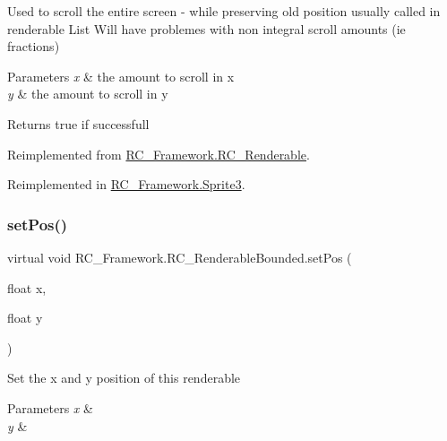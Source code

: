 Used to scroll the entire screen -\/ while preserving old position usually called in renderable List Will have problemes with non integral scroll amounts (ie fractions) 


\begin{DoxyParams}{Parameters}
{\em x} & the amount to scroll in x \\
\hline
{\em y} & the amount to scroll in y\\
\hline
\end{DoxyParams}
\begin{DoxyReturn}{Returns}
true if successfull 
\end{DoxyReturn}


Reimplemented from \mbox{\hyperlink{class_r_c___framework_1_1_r_c___renderable_a21e5b1a68c7382443c82e7296fd2209a}{R\+C\+\_\+\+Framework.\+R\+C\+\_\+\+Renderable}}.



Reimplemented in \mbox{\hyperlink{class_r_c___framework_1_1_sprite3_ab4c64556d7bcebf5ce538631ae9b5d6c}{R\+C\+\_\+\+Framework.\+Sprite3}}.

\mbox{\label{class_r_c___framework_1_1_r_c___renderable_bounded_a49d38185d66bf150677aaf9cc35eb4fa}} 
\subsubsection{\texorpdfstring{set\+Pos()}{setPos()}}
{\footnotesize\ttfamily virtual void R\+C\+\_\+\+Framework.\+R\+C\+\_\+\+Renderable\+Bounded.\+set\+Pos (\begin{DoxyParamCaption}\item[{float}]{x,  }\item[{float}]{y }\end{DoxyParamCaption})\hspace{0.3cm}{\ttfamily [virtual]}}



Set the x and y position of this renderable 


\begin{DoxyParams}{Parameters}
{\em x} & \\
\hline
{\em y} & \\
\hline
\end{DoxyParams}


